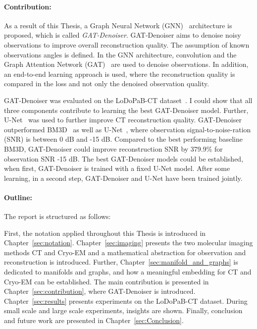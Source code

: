 \paragraph{Contribution:}

As a result of this Thesis, a Graph Neural Network (GNN)~\cite{GNN} architecture is proposed, which is called \textit{GAT-Denoiser}.
GAT-Denoiser aims to denoise noisy observations to improve overall reconstruction quality.
The assumption of known observations angles is defined.
In the GNN architecture, convolution and the Graph Attention Network (GAT)~\cite{GAT} are used to denoise observations.
In addition, an end-to-end learning approach is used, where the reconstruction quality is compared in the loss
and not only the denoised observation quality.

GAT-Denoiser was evaluated on the LoDoPaB-CT dataset~\cite{lodopab-dataset}.
I could show that all three components contribute to learning the best GAT-Denoiser model.
Further, U-Net~\cite{unet-tomography} was used to further improve CT reconstruction quality.
GAT-Denoiser outperformed BM3D~\cite{bm3d} as well as U-Net~\cite{unet-tomography},
where observation signal-to-noise-ration (SNR) is between 0 dB and -15 dB.
Compared to the best performing baseline BM3D, GAT-Denoiser could improve reconstruction SNR 
by 379.9\% for observation SNR -15 dB.
The best GAT-Denoiser models could be established, when first, GAT-Denoiser is trained with a fixed U-Net model.
After some learning, in a second step, GAT-Denoiser and U-Net have been trained jointly.


\paragraph{Outline:}

The report is structured as follows: 

First, the notation applied throughout this Thesis is introduced in Chapter~\ref{sec:notation}.
 Chapter~\ref{sec:imaging} presents the two molecular imaging methods
CT and Cryo-EM and a mathematical abstraction for observation and reconstruction is introduced.
Further, Chapter~\ref{sec:manifold_and_graphs} is dedicated to manifolds and graphs,
and how a meaningful embedding for CT and Cryo-EM can be established. 
The main contribution is presented in Chapter~\ref{sec:contribution}, 
where GAT-Denoiser is introduced. Chapter~\ref{sec:results} presents experiments on the LoDoPaB-CT dataset.
During small scale and large scale experiments, insights are shown.
Finally, conclusion and future work are presented in Chapter~\ref{sec:Conclusion}.

